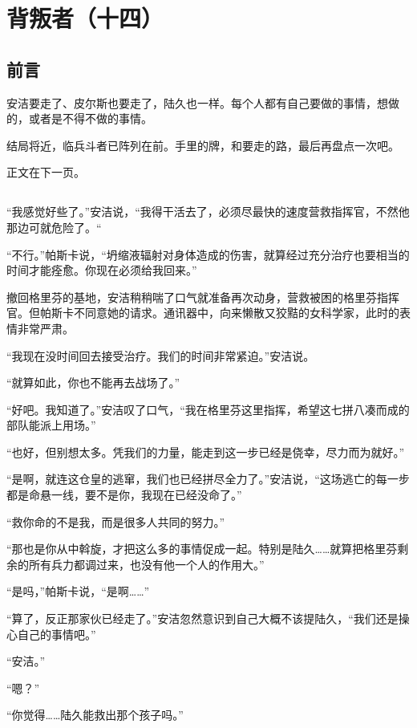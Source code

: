 \chapter{背叛者（十四）}

\section*{前言}
安洁要走了、皮尔斯也要走了，陆久也一样。每个人都有自己要做的事情，想做的，或者是不得不做的事情。

\lineseparator

结局将近，临兵斗者已阵列在前。手里的牌，和要走的路，最后再盘点一次吧。

正文在下一页。

\section*{}

“我感觉好些了。”安洁说，“我得干活去了，必须尽最快的速度营救指挥官，不然他那边可就危险了。“

“不行。”帕斯卡说，“坍缩液辐射对身体造成的伤害，就算经过充分治疗也要相当的时间才能痊愈。你现在必须给我回来。”

撤回格里芬的基地，安洁稍稍喘了口气就准备再次动身，营救被困的格里芬指挥官。但帕斯卡不同意她的请求。通讯器中，向来懒散又狡黠的女科学家，此时的表情非常严肃。

“我现在没时间回去接受治疗。我们的时间非常紧迫。”安洁说。

“就算如此，你也不能再去战场了。”

“好吧。我知道了。”安洁叹了口气，“我在格里芬这里指挥，希望这七拼八凑而成的部队能派上用场。”

“也好，但别想太多。凭我们的力量，能走到这一步已经是侥幸，尽力而为就好。”

“是啊，就连这仓皇的逃窜，我们也已经拼尽全力了。”安洁说，“这场逃亡的每一步都是命悬一线，要不是你，我现在已经没命了。”

“救你命的不是我，而是很多人共同的努力。”

“那也是你从中斡旋，才把这么多的事情促成一起。特别是陆久……就算把格里芬剩余的所有兵力都调过来，也没有他一个人的作用大。”

“是吗，”帕斯卡说，“是啊……”

“算了，反正那家伙已经走了。”安洁忽然意识到自己大概不该提陆久，“我们还是操心自己的事情吧。”

“安洁。”

“嗯？”

“你觉得……陆久能救出那个孩子吗。”

